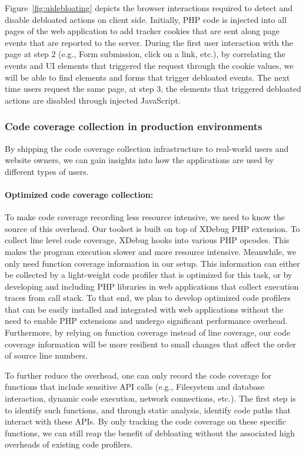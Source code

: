 Figure~\ref{fig:uidebloating} depicts the browser interactions required to detect and disable debloated actions on client side. Initially, PHP code is injected into all pages of the web application to add tracker cookies that are sent along page events that are reported to the server. During the first user interaction with the page at step 2 (e.g., Form submission, click on a link, etc.), by correlating the events and UI elements that triggered the request through the cookie values, we will be able to find elements and forms that trigger debloated events. The next time users request the same page, at step 3, the elements that triggered debloated actions are disabled through injected JavaScript.

\subsubsection{Code coverage collection in production environments}
By shipping the code coverage collection infrastructure to real-world users and website owners, we can gain insights into how the applications are used by different types of users.

\paragraph{Optimized code coverage collection:} To make code coverage recording less resource intensive, we need to know the source of this overhead.
Our toolset is built on top of XDebug PHP extension. To collect line level code coverage, XDebug hooks into various PHP opcodes. This makes the program execution slower and more resource intensive. Meanwhile, we only need function coverage information in our setup. This information can either be collected by a light-weight code profiler that is optimized for this task, or by developing and including PHP libraries in web applications that collect execution traces from call stack. To that end, we plan to develop optimized code profilers that can be easily installed and integrated with web applications without the need to enable PHP extensions and undergo significant performance overhead. Furthermore, by relying on function coverage instead of line coverage, our code coverage information will be more resilient to small changes that affect the order of source line numbers.

To further reduce the overhead, one can only record the code coverage for functions that include sensitive API calls (e.g., Filesystem and database interaction, dynamic code execution, network connections, etc.). The first step is to identify such functions, and through static analysis, identify code paths that interact with these APIs. By only tracking the code coverage on these specific functions, we can still reap the benefit of debloating without the associated high overheads of existing code profilers.

